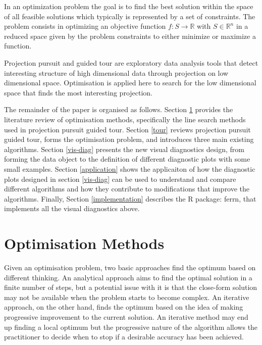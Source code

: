 \documentclass[12pt]{article}
\begin{document}
In an optimization problem the goal is to find the best solution within
the space of all feasible solutions which typically is represented by a
set of constraints. The problem consists in optimizing an objective
function \(f: S \rightarrow \mathbb{R}\) with \(S \in \mathbb{R}^n\) in
a reduced space given by the problem constraints to either minimize or
maximize a function.

Projection pursuit and guided tour are exploratory data analysis tools
that detect interesting structure of high dimensional data through
projection on low dimensional space. Optimisation is applied here to
search for the low dimensional space that finds the most interesting
projection.

The remainder of the paper is organised as follows. Section \ref{optim}
provides the literature review of optimisation methods, specifically the
line search methods used in projection pursuit guided tour. Section
\ref{tour} reviews projection pursuit guided tour, forms the
optimisation problem, and introduces three main existing algorithms.
Section \ref{vis-diag} presents the new visual diagnostics design, from
forming the data object to the definition of different diagnostic plots
with some small examples. Section \ref{application} shows the
applicaiton of how the diagnostic plots designed in section
\ref{vis-diag} can be used to understand and compare different
algorithms and how they contribute to modifications that improve the
algorithms. Finally, Section \ref{implementation} describes the R
package: ferrn, that implements all the visual diagnostics above.

\newpage

\hypertarget{optim}{%
\section{Optimisation Methods}\label{optim}}

Given an optimisation problem, two basic approaches find the optimum
based on different thinking. An analytical approach aims to find the
optimal solution in a finite number of steps, but a potential issue with
it is that the close-form solution may not be available when the problem
starts to become complex. An iterative approach, on the other hand,
finds the optimum based on the idea of making progressive improvement to
the current solution. An iterative method may end up finding a local
optimum but the progressive nature of the algorithm allows the
practitioner to decide when to stop if a desirable accuracy has been
achieved.
\end{document}

